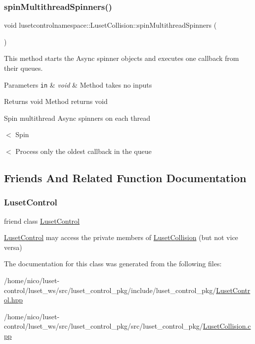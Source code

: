 \subsubsection{\texorpdfstring{spin\+Multithread\+Spinners()}{spinMultithreadSpinners()}}
{\footnotesize\ttfamily void lusetcontrolnamespace\+::\+Luset\+Collision\+::spin\+Multithread\+Spinners (\begin{DoxyParamCaption}{ }\end{DoxyParamCaption})}



This method starts the Async spinner objects and executes one callback from their queues. 


\begin{DoxyParams}[1]{Parameters}
\mbox{\tt in}  & {\em void} & Method takes no inputs \\
\hline
\end{DoxyParams}
\begin{DoxyReturn}{Returns}
void Method returns void 
\end{DoxyReturn}
Spin multithread Async spinners on each thread

$<$ Spin

$<$ Process only the oldest callback in the queue 

\subsection{Friends And Related Function Documentation}
\mbox{\label{classlusetcontrolnamespace_1_1LusetCollision_a1a34ac10d34617ed2df4ec2e7d6c12a8}} 
\subsubsection{\texorpdfstring{Luset\+Control}{LusetControl}}
{\footnotesize\ttfamily friend class \hyperlink{classlusetcontrolnamespace_1_1LusetControl}{Luset\+Control}\hspace{0.3cm}{\ttfamily [friend]}}



\hyperlink{classlusetcontrolnamespace_1_1LusetControl}{Luset\+Control} may access the private members of \hyperlink{classlusetcontrolnamespace_1_1LusetCollision}{Luset\+Collision} (but not vice versa) 



The documentation for this class was generated from the following files\+:\begin{DoxyCompactItemize}
\item 
/home/nico/luset-\/control/luset\+\_\+ws/src/luset\+\_\+control\+\_\+pkg/include/luset\+\_\+control\+\_\+pkg/\hyperlink{LusetControl_8hpp}{Luset\+Control.\+hpp}\item 
/home/nico/luset-\/control/luset\+\_\+ws/src/luset\+\_\+control\+\_\+pkg/src/luset\+\_\+control\+\_\+pkg/\hyperlink{LusetCollision_8cpp}{Luset\+Collision.\+cpp}\end{DoxyCompactItemize}
